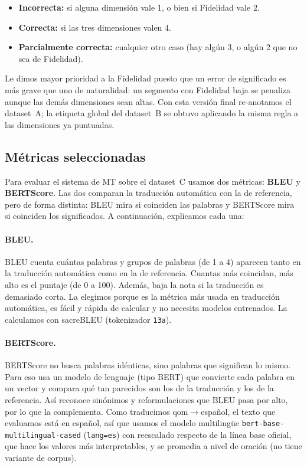 \begin{itemize}
  \item \textbf{Incorrecta:} si alguna dimensión vale 1, o bien si Fidelidad
  vale 2.
  \item \textbf{Correcta:} si las tres dimensiones valen 4.
  \item \textbf{Parcialmente correcta:} cualquier otro caso (hay algún 3, o algún
  2 que no sea de Fidelidad).
\end{itemize}

\noindent Le dimos mayor prioridad a la Fidelidad puesto que un error de
significado es más grave que uno de naturalidad: un segmento con Fidelidad baja se
penaliza aunque las demás dimensiones sean altas. Con esta versión final
re-anotamos el dataset~A; la etiqueta global del dataset~B se obtuvo aplicando la
misma regla a las dimensiones ya puntuadas.

\subsection{Métricas seleccionadas}
\label{sec:metodologia-metricas}
Para evaluar el sistema de MT sobre el dataset~C usamos dos métricas:
\textbf{BLEU} y \textbf{BERTScore}. Las dos comparan la traducción automática con
la de referencia, pero de forma distinta: BLEU mira si coinciden las palabras y
BERTScore mira si coinciden los significados. A continuación, explicamos cada una:

\paragraph{BLEU.}
BLEU \citep{papineni2002bleu} cuenta cuántas palabras y grupos de palabras (de 1 a
4) aparecen tanto en la traducción automática como en la de referencia. Cuantas
más coincidan, más alto es el puntaje (de 0 a 100). Además, baja la nota si la
traducción es demasiado corta. La elegimos porque es la métrica más usada en
traducción automática, es fácil y rápida de calcular y no necesita modelos
entrenados. La calculamos con sacreBLEU \citep{post2018call} (tokenizador
\texttt{13a}).

\paragraph{BERTScore.}
BERTScore \citep{zhang2020bertscore} no busca palabras idénticas, sino palabras que
significan lo mismo. Para eso usa un modelo de lenguaje (tipo BERT) que
convierte cada palabra en un vector y compara qué tan parecidos son los de la
traducción y los de la referencia. Así reconoce sinónimos y reformulaciones que
BLEU pasa por alto, por lo que la complementa. Como traducimos
qom$\rightarrow$español, el texto que evaluamos está en español, así que usamos el
modelo multilingüe \texttt{bert-base-multilingual-cased} (\texttt{lang=es}) con
reescalado respecto de la línea base oficial, que hace los valores más
interpretables, y se promedia a nivel de oración (no tiene variante de corpus).

